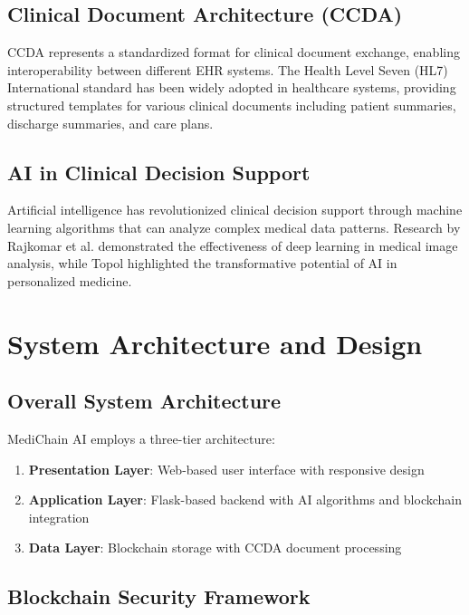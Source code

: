 \documentclass[conference]{IEEEtran}
\begin{document}
\subsection{Clinical Document Architecture (CCDA)}

CCDA represents a standardized format for clinical document exchange, enabling interoperability between different EHR systems. The Health Level Seven (HL7) International standard has been widely adopted in healthcare systems, providing structured templates for various clinical documents including patient summaries, discharge summaries, and care plans.

\subsection{AI in Clinical Decision Support}

Artificial intelligence has revolutionized clinical decision support through machine learning algorithms that can analyze complex medical data patterns. Research by Rajkomar et al. \cite{rajkomar2019} demonstrated the effectiveness of deep learning in medical image analysis, while Topol \cite{topol2019} highlighted the transformative potential of AI in personalized medicine.

\section{System Architecture and Design}

\subsection{Overall System Architecture}

MediChain AI employs a three-tier architecture:
\begin{enumerate}
    \item \textbf{Presentation Layer}: Web-based user interface with responsive design
    \item \textbf{Application Layer}: Flask-based backend with AI algorithms and blockchain integration
    \item \textbf{Data Layer}: Blockchain storage with CCDA document processing
\end{enumerate}

\subsection{Blockchain Security Framework}
\end{document}
